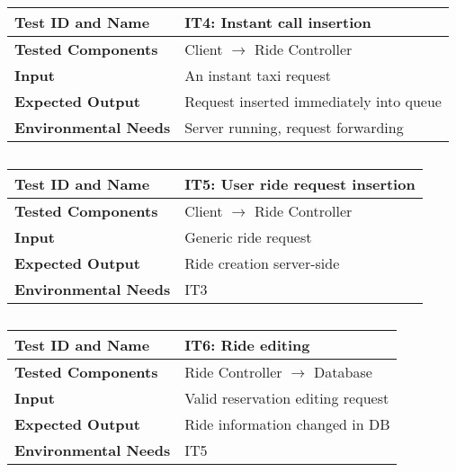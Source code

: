 \subsection{}

\begin{tabular}{l p{}}
    \hline
    \textbf{Test ID and Name} & IT4: Instant call insertion\\
    \hline
    \textbf{Tested Components} & Client $\rightarrow$ Ride Controller\\
    \hline
    \textbf{Input} & An instant taxi request\\
    \hline
    \textbf{Expected Output} & Request inserted immediately into queue\\
    \hline
    \textbf{Environmental Needs} & Server running, request forwarding\\
    \hline
\end{tabular}

\subsection{}

\begin{tabular}{l p{}}
    \hline
    \textbf{Test ID and Name} & IT5: User ride request insertion\\
    \hline
    \textbf{Tested Components} & Client $\rightarrow$ Ride Controller\\
    \hline
    \textbf{Input} & Generic ride request\\
    \hline
    \textbf{Expected Output} & Ride creation server-side\\
    \hline
    \textbf{Environmental Needs} & IT3\\
    \hline
\end{tabular}

\subsection{}

\begin{tabular}{l p{}}
    \hline
    \textbf{Test ID and Name} & IT6: Ride editing\\
    \hline
    \textbf{Tested Components} & Ride Controller $\rightarrow$ Database\\
    \hline
    \textbf{Input} & Valid reservation editing request\\
    \hline
    \textbf{Expected Output} & Ride information changed in DB\\
    \hline
    \textbf{Environmental Needs} & IT5\\
    \hline
\end{tabular}

